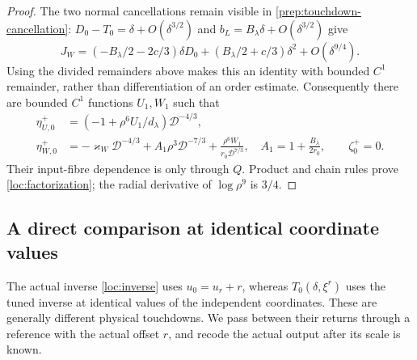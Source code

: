\begin{proof}
The two normal cancellations remain visible in
\eqref{prep:touchdown-cancellation}: $D_0-T_0=\delta+O(\delta^{3/2})$
and $b_L=B_\lambda\delta+O(\delta^{3/2})$ give
\[
 J_W=(-B_\lambda/2-2c/3)\delta D_0
        +(B_\lambda/2+c/3)\delta^2+O(\delta^{9/4}).
\]
Using the divided remainders above makes this an identity with bounded
$C^1$ remainder, rather than differentiation of an order estimate.
Consequently there are bounded $C^1$ functions $U_1,W_1$ such that
\begin{equation}
 \begin{aligned}
 \eta_{U,0}^+&=(-1+\rho^6U_1/d_\lambda)\mathcal D^{-4/3},\\
 \eta_{W,0}^+&=-\varkappa_W\mathcal D^{-4/3}
       +A_1\rho^3\mathcal D^{-7/3}
       +\frac{\rho^6W_1}{r_0\mathcal D^{7/3}},
 \quad A_1=1+\frac{B_\lambda}{2r_0},\qquad \zeta_0^+=0.
 \end{aligned}\label{ret:regular-fibres}
\end{equation}
Their input-fibre dependence is only through $Q$. Product and chain
rules prove \eqref{loc:factorization}; the radial derivative of
$\log\rho^9$ is $3/4$.
\end{proof}

\subsection{A direct comparison at identical coordinate values}

The actual inverse \eqref{loc:inverse} uses $u_0=u_r+r$,
whereas $T_0(\delta,\xi^r)$ uses the tuned inverse at identical
values of the independent coordinates. These are generally different
physical touchdowns.
We pass between their returns through a reference with the actual
offset $r$, and recode the actual output after its scale is known.


